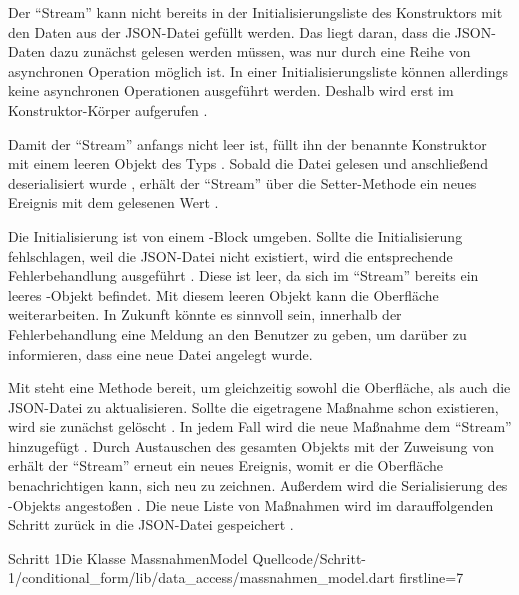 Der \enquote{Stream} kann nicht bereits in der Initialisierungsliste des Konstruktors mit den Daten aus der JSON-Datei gefüllt werden.
Das liegt daran, dass die JSON-Daten dazu zunächst gelesen werden müssen, was nur durch eine Reihe von asynchronen Operation möglich ist.
In einer Initialisierungsliste können allerdings keine asynchronen Operationen ausgeführt werden.
Deshalb wird  erst im Konstruktor-Körper aufgerufen .

Damit der \enquote{Stream} anfangs nicht leer ist, füllt ihn der benannte Konstruktor  mit einem leeren Objekt des Typs  .
Sobald die Datei gelesen  und anschließend deserialisiert wurde , erhält der \enquote{Stream} über die Setter-Methode  ein neues Ereignis mit dem gelesenen Wert .

Die Initialisierung ist von einem -Block umgeben.
Sollte die Initialisierung fehlschlagen, weil die JSON-Datei nicht existiert, wird die entsprechende Fehlerbehandlung ausgeführt .
Diese ist leer, da sich im \enquote{Stream} bereits ein leeres -Objekt  befindet.
Mit diesem leeren Objekt kann die Oberfläche weiterarbeiten.
In Zukunft könnte es sinnvoll sein, innerhalb der Fehlerbehandlung eine Meldung an den Benutzer zu geben, um darüber zu informieren, dass eine neue Datei angelegt wurde.

Mit   steht eine Methode bereit, um gleichzeitig  sowohl die Oberfläche,  als auch die JSON-Datei zu aktualisieren.
Sollte die eigetragene Maßnahme schon existieren, wird sie zunächst gelöscht .
In jedem Fall wird die neue Maßnahme dem \enquote{Stream} hinzugefügt .
Durch Austauschen des gesamten Objekts mit der Zuweisung von   erhält der \enquote{Stream} erneut ein neues Ereignis, womit er die Oberfläche benachrichtigen kann, sich neu zu zeichnen. Außerdem wird die Serialisierung des -Objekts angestoßen . Die neue Liste von Maßnahmen wird im darauffolgenden Schritt zurück in die JSON-Datei gespeichert .

\begin{alexlisting}{Schritt 1}{Die Klasse MassnahmenModel}
  {Quellcode/Schritt-1/conditional_form/lib/data_access/massnahmen_model.dart}
  {firstline=7}
  \label{lst:Schritt1KlasseMassnahmenModel}
\end{alexlisting}
